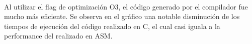 \documentclass[a4paper]{article}
\begin{document}
\noindent%
\begin{minipage}{\linewidth}%
\end{minipage}
\ \

Al utilizar el flag de optimización O3, el código generado por el compilador fue mucho más eficiente. Se observa en el gráfico una notable disminución de los tiempos de ejecución del código realizado en C, el cual casi iguala a la performance del realizado en ASM.

\end{document}
